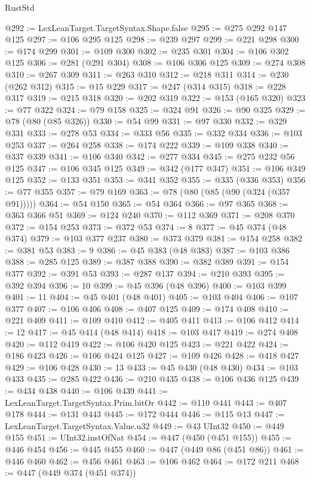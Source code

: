 \begin{lexlean}{RustStd}
\begin{coremodule}
@292 := LexLeanTarget.TargetSyntax.Shape.false
@295 := @275 @292 @147 @125
@297 := @106 @295 @125
@298 := @239 @297
@299 := @221 @298
@300 := @174 @299
@301 := @109 @300
@302 := @235 @301
@304 := @106 @302 @125
@306 := @281 (@291 @304)
@308 := @106 @306 @125
@309 := @274 @308
@310 := @267 @309
@311 := @263 @310
@312 := @218 @311
@314 := @230 (@262 @312)
@315 := @15 @229
@317 := @247 (@314 @315)
@318 := @228 @317
@319 := @215 @318
@320 := @202 @319
@322 := @153 (@165 @320)
@323 := @77 @322
@324 := @79 @158
@325 := @324 @91
@326 := @90 @325
@329 := @78 (@80 (@85 @326))
@330 := @54 @99
@331 := @97 @330
@332 := @329 @331
@333 := @278 @53
@334 := @333 @56
@335 := @332 @334
@336 := @103 @253
@337 := @264 @258
@338 := @174 @222
@339 := @109 @338
@340 := @337 @339
@341 := @106 @340
@342 := @277 @334
@345 := @275 @232 @56 @125
@347 := @106 @345 @125
@349 := @342 (@177 @347)
@351 := @106 @349 @125
@352 := @133 @351
@353 := @341 @352
@355 := @335 (@336 @353)
@356 := @77 @355
@357 := @79 @169
@363 := @78 (@80 (@85 (@90 (@324 (@357 @91)))))
@364 := @54 @150
@365 := @54 @364
@366 := @97 @365
@368 := @363 @366 @51
@369 := @124 @240
@370 := @112 @369
@371 := @208 @370
@372 := @154 @253
@373 := @372 @53
@374 := 8
@377 := @45 @374 (@48 @374)
@379 := @103 @377 @237
@380 := @373 @379
@381 := @154 @258
@382 := @381 @53
@383 := 9
@386 := @45 @383 (@48 @383)
@387 := @103 @386
@388 := @285 @125
@389 := @387 @388
@390 := @382 @389
@391 := @154 @377
@392 := @391 @53
@393 := @287 @137
@394 := @210 @393
@395 := @392 @394
@396 := 10
@399 := @45 @396 (@48 @396)
@400 := @103 @399
@401 := 11
@404 := @45 @401 (@48 @401)
@405 := @103 @404
@406 := @107 @377
@407 := @106 @406
@408 := @407 @125
@409 := @174 @408
@410 := @221 @409
@411 := @109 @410
@412 := @405 @411
@413 := @106 @412
@414 := 12
@417 := @45 @414 (@48 @414)
@418 := @103 @417
@419 := @274 @408
@420 := @112 @419
@422 := @106 @420 @125
@423 := @221 @422
@424 := @186 @423
@426 := @106 @424 @125
@427 := @109 @426
@428 := @418 @427
@429 := @106 @428
@430 := 13
@433 := @45 @430 (@48 @430)
@434 := @103 @433
@435 := @285 @422
@436 := @210 @435
@438 := @106 @436 @125
@439 := @434 @438
@440 := @106 @439
@441 := LexLeanTarget.TargetSyntax.Prim.bitOr
@442 := @110 @441
@443 := @407 @178
@444 := @131 @443
@445 := @172 @444
@446 := @115 @13
@447 := LexLeanTarget.TargetSyntax.Value.u32
@449 := @43 UInt32
@450 := @449 @155
@451 := UInt32.instOfNat
@454 := @447 (@450 (@451 @155))
@455 := @446 @454
@456 := @445 @455
@460 := @447 (@449 @86 (@451 @86))
@461 := @446 @460
@462 := @456 @461
@463 := @106 @462
@464 := @172 @211
@468 := @447 (@449 @374 (@451 @374))

\end{coremodule}
\end{lexlean}
